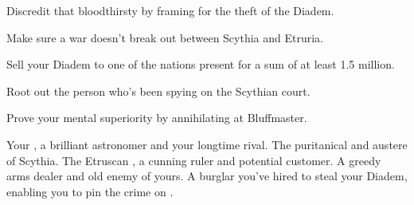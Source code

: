 \documentclass[char]{Kos}
\begin{document}
\begin{itemz}[Goals]
\item Discredit that bloodthirsty \cArmsDealer{\InsultThree} \cArmsDealer{} by framing \cArmsDealer{\them} for the theft of the Diadem.
\item Make sure a war doesn't break out between Scythia and Etruria.
\item Sell your Diadem to one of the nations present for a sum of at least 1.5 million.
\item Root out the person who's been spying on the Scythian court.
\item Prove your mental superiority by annihilating \cArmsDealer{} at Bluffmaster.
\end{itemz}

\begin{contacts}
\contact{\cAnarchist{}} Your \cAnarchist{\sibling}, a brilliant astronomer and your longtime rival.
\contact{\cScythiaQueen{}} The puritanical and austere \cScythiaQueen{\monarch} of Scythia.
\contact{\cEtruriaKing{}} The Etruscan \cEtruriaKing{\monarch}, a cunning ruler and potential customer.
\contact{\cArmsDealer{}} A greedy arms dealer and old enemy of yours.
\contact{\cBurglar{}} A burglar you've hired to steal your Diadem, enabling you to pin the crime on \cArmsDealer{}.
\end{contacts}
\end{document}
